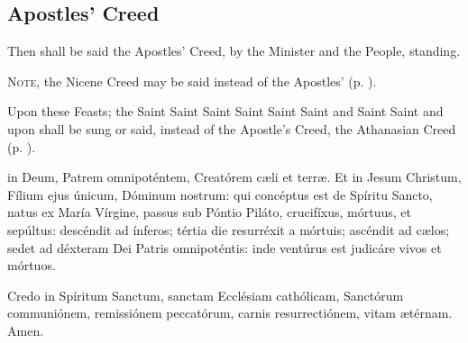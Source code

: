 \subsection{Apostles' Creed}
\begin{rubric}
    Then shall be said the Apostles' Creed, by the Minister and the People, standing.%
\end{rubric}
\begin{rubric}
	\textsc{Note,} the Nicene Creed may be said instead of the Apostles' (p. \pageref{NiceneCreed}).
\end{rubric}
\begin{rubric}
    Upon these Feasts;  the  Saint     Saint  Saint  Saint  Saint  Saint  and Saint  Saint  and upon  shall be sung or said, instead of the Apostle's Creed, the Athanasian Creed (p. \pageref{Ath}).
\end{rubric}
    { in Deum, Patrem omnipoténtem, Creatórem c{\ae}li et terr{\ae}. Et in Jesum Christum, Fílium ejus únicum, Dóminum nostrum: qui concéptus est de Spíritu Sancto, natus ex María Vírgine, passus sub Póntio Piláto, crucifíxus, mórtuus, et sepúltus: descéndit ad ínferos; tértia die resurréxit a mórtuis; ascéndit ad c{\ae}los; sedet ad déxteram Dei Patris omnipoténtis: inde ventúrus est judicáre vivos et mórtuos.\par
     Credo in Spíritum Sanctum, sanctam Ecclésiam cathólicam, Sanctórum communiónem, remissiónem peccatórum, carnis {} resurrectiónem, vitam {\ae}térnam. Amen.}

